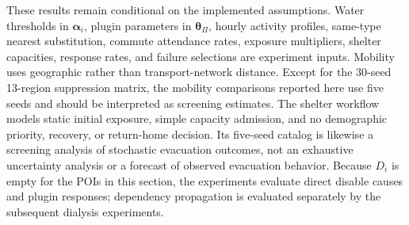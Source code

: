 These results remain conditional on the implemented assumptions. Water thresholds in $\bm{\alpha}_i$, plugin parameters in $\bm{\theta}_{\Pi}$, hourly activity profiles, same-type nearest substitution, commute attendance rates, exposure multipliers, shelter capacities, response rates, and failure selections are experiment inputs. Mobility uses geographic rather than transport-network distance. Except for the 30-seed 13-region suppression matrix, the mobility comparisons reported here use five seeds and should be interpreted as screening estimates. The shelter workflow models static initial exposure, simple capacity admission, and no demographic priority, recovery, or return-home decision. Its five-seed catalog is likewise a screening analysis of stochastic evacuation outcomes, not an exhaustive uncertainty analysis or a forecast of observed evacuation behavior. Because $D_i$ is empty for the POIs in this section, the experiments evaluate direct disable causes and plugin responses; dependency propagation is evaluated separately by the subsequent dialysis experiments.
